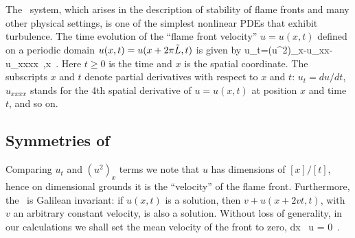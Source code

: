 

\section{\KSe}
\label{s-KS}


The \KS\ system, which
arises in the description of stability of
flame fronts and many other physical settings,
is one of the simplest nonlinear PDEs that
exhibit turbulence.
The time evolution of the ``flame front velocity'' 
$u=u(x,t)$ defined on a periodic domain
$u(x,t) = u(x+2\pi \tilde{L},t)$
is given by
\beq
    u_t=(u^2)_x-u_{xx}- u_{xxxx}
    \,,\qquad   x \in [0,2\pi \tildeL]
    \,.
Here $t \geq 0$ is the time and
$x$ is the spatial coordinate.
The subscripts $x$ and $t$ denote partial derivatives with respect to
$x$ and $t$:
$u_t = du/dt$, $u_{xxxx}$ stands for the 4th spatial
derivative of 
$u=u(x,t)$ at position $x$ and time $t$, and so on.




\subsection{Symmetries of \KSe}

Comparing $u_t$ and $(u^2)_x$ terms we note that $u$ has
dimensions of $[x]/[t]$, hence on dimensional grounds
it is the ``velocity'' of the flame front. 
Furthermore, the  \KSe\ is
Galilean invariant: if $u(x,t)$ is a solution, then 
$v+u(x+2vt,t)$, with $v$ an arbitrary constant velocity, is also a solution. 
Without loss of generality, in our calculations we shall set 
the mean velocity of the  front to zero,
\beq
\int dx \, u = 0
\,.

